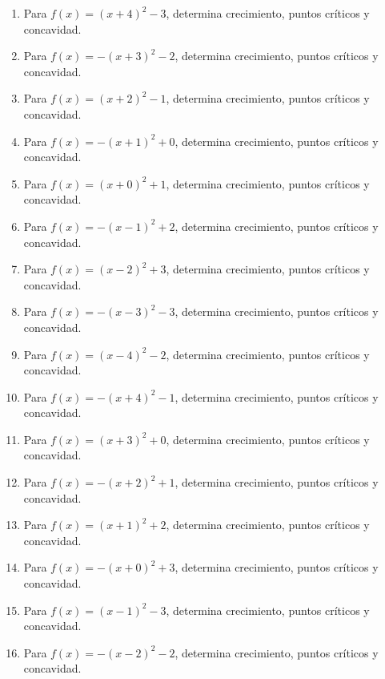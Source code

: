 \documentclass[11pt,a4paper]{article}
\begin{document}
\begin{enumerate}[label=\textbf{E\arabic*.},start=101]

\item Para $f(x)=(x+4)^2-3$, determina crecimiento, puntos críticos y concavidad.

\item Para $f(x)=-(x+3)^2-2$, determina crecimiento, puntos críticos y concavidad.

\item Para $f(x)=(x+2)^2-1$, determina crecimiento, puntos críticos y concavidad.

\item Para $f(x)=-(x+1)^2+0$, determina crecimiento, puntos críticos y concavidad.

\item Para $f(x)=(x+0)^2+1$, determina crecimiento, puntos críticos y concavidad.

\item Para $f(x)=-(x-1)^2+2$, determina crecimiento, puntos críticos y concavidad.

\item Para $f(x)=(x-2)^2+3$, determina crecimiento, puntos críticos y concavidad.

\item Para $f(x)=-(x-3)^2-3$, determina crecimiento, puntos críticos y concavidad.

\item Para $f(x)=(x-4)^2-2$, determina crecimiento, puntos críticos y concavidad.

\item Para $f(x)=-(x+4)^2-1$, determina crecimiento, puntos críticos y concavidad.

\item Para $f(x)=(x+3)^2+0$, determina crecimiento, puntos críticos y concavidad.

\item Para $f(x)=-(x+2)^2+1$, determina crecimiento, puntos críticos y concavidad.

\item Para $f(x)=(x+1)^2+2$, determina crecimiento, puntos críticos y concavidad.

\item Para $f(x)=-(x+0)^2+3$, determina crecimiento, puntos críticos y concavidad.

\item Para $f(x)=(x-1)^2-3$, determina crecimiento, puntos críticos y concavidad.

\item Para $f(x)=-(x-2)^2-2$, determina crecimiento, puntos críticos y concavidad.


\end{enumerate}
\end{document}
